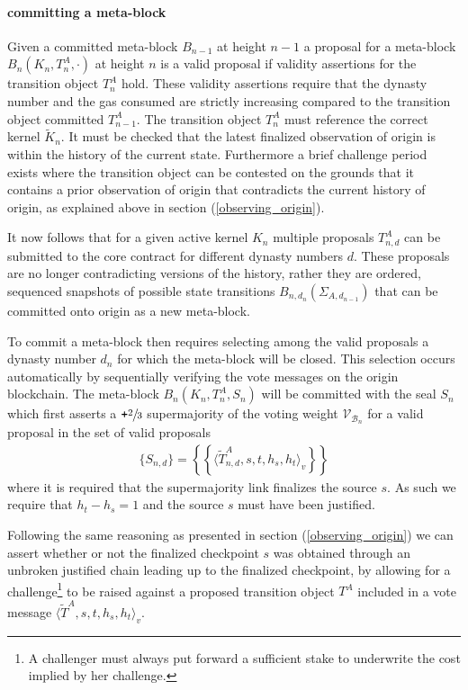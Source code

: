 \documentclass[12pt,a4paper]{article}
\begin{document}
\paragraph{committing a meta-block} Given a committed meta-block $B_{n-1}$ at height $n-1$ a proposal for a meta-block $B_{n}(K_{n}, T^A_{n}, \cdot)$ at height $n$ is a valid proposal if validity assertions for the transition object $T^A_n$ hold.  These validity assertions require that the dynasty number and the gas consumed are strictly increasing compared to the transition object committed $T^A_{n-1}$. The transition object $T^A_n$ must reference the correct kernel $\tilde{K}_n$. It must be checked that the latest finalized observation of origin is within the history of the current state. Furthermore a brief challenge period exists where the transition object can be contested on the grounds that it contains a prior observation of origin that contradicts the current history of origin, as explained above in section (\ref{observing_origin}).

It now follows that for a given active kernel $K_n$ multiple proposals $T^{A}_{n,d}$ can be submitted to the core contract for different dynasty numbers $d$. These proposals are no longer contradicting versions of the history, rather they are ordered, sequenced snapshots of possible state transitions $B_{n,d_{n}}(\Sigma_{A,d_{n-1}})$ that can be committed onto origin as a new meta-block.

To commit a meta-block then requires selecting among the valid proposals a dynasty number $d_n$ for which the meta-block will be closed. This selection occurs automatically by sequentially verifying the vote messages on the origin blockchain.
The meta-block $B_n(K_n, T^A_n, S_n)$ will be committed with the seal $S_n$ which first asserts a $\texttt{+}\sfrac{2}{3}$ supermajority of the voting weight $\mathcal{V}_{\mathcal{B}_n}$ for a valid proposal in the set of valid proposals
\begin{align*}
  \{S_{n,d}\} = \left\{\left\{\langle\tilde{T}^A_{n,d}, s, t, h_s, h_t\rangle_v\right\}\right\}
\end{align*}
where it is required that the supermajority link finalizes the source $s$.
As such we require that $h_t - h_s = 1$ and the source $s$ must have been justified.

Following the same reasoning as presented in section (\ref{observing_origin}) we can assert whether or not the finalized checkpoint $s$ was obtained through an unbroken justified chain leading up to the finalized checkpoint, by allowing for a challenge\footnote{A challenger must always put forward a sufficient stake to underwrite the cost implied by her challenge.} to be raised against a proposed transition object $T^A$ included in a vote message $\langle\tilde{T}^A, s, t, h_s, h_t\rangle_v$.
\end{document}
